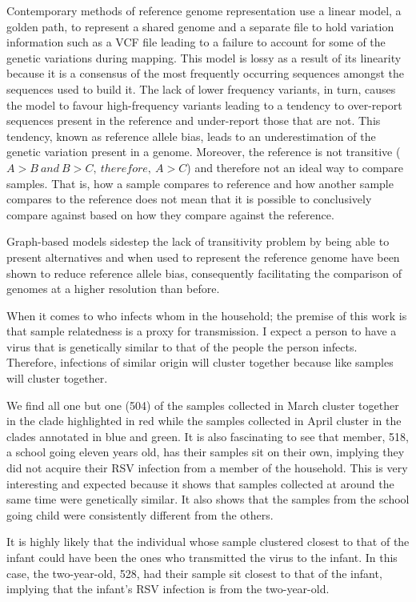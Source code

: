 \documentclass[10pt, a4paper]{article}
\begin{document}
Contemporary methods of reference genome representation use a linear model, a
golden path, to represent a shared genome and a separate file to hold variation
information such as a VCF file leading to a failure to account for some of the
genetic variations during mapping.
This model is lossy as a result of its linearity because it is a consensus of
the most frequently occurring sequences amongst the sequences used to build it.
The lack of lower frequency variants, in turn, causes the model to favour
high-frequency variants leading to a tendency to over-report sequences present
in the reference and under-report those that are not.
This tendency, known as reference allele bias, leads to an underestimation of
the genetic variation present in a genome. Moreover, the reference is not
transitive (\(A>B\ and\ B>C,\ therefore,\ A>C\)) and therefore not an ideal way to compare samples.
That is, how a sample  compares to reference and how another sample  compares to
the reference does not mean that it is possible to conclusively compare  against
based on how they compare against the reference.

Graph-based models sidestep the lack of transitivity problem by being able to
present alternatives and when used to represent the reference genome have been
shown to reduce reference allele bias, consequently facilitating the comparison
of genomes at a higher resolution than before.

When it comes to who infects whom in the household; the premise of this work is
that sample relatedness is a proxy for transmission.
I expect a person to have a virus that is genetically similar to that of the
people the person infects. Therefore, infections of similar origin will cluster
together because like samples will cluster together.

We find all one but one (504) of the samples collected in March cluster together
in the clade highlighted in red while the samples collected in April cluster in
the clades annotated in blue and green. It is also fascinating to see that
member, 518, a school going eleven years old, has their samples sit on their
own, implying they did not acquire their RSV infection from a member of the
household. This is very interesting and expected because it shows that samples
collected at around the same time were genetically similar.
It also shows that the samples from the school going child were consistently
different from the others.

It is highly likely that the individual whose sample clustered closest to that
of the infant could have been the ones who transmitted the virus to the infant.
In this case, the two-year-old, 528, had their sample sit closest to that of the
infant, implying that the infant's RSV infection is from the two-year-old.
\end{document}
